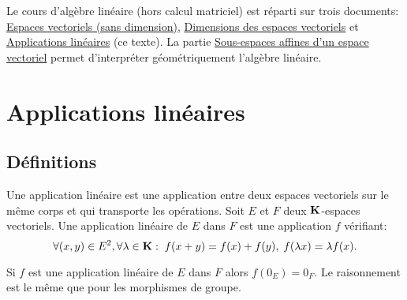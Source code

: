 

Le cours d'algèbre linéaire (hors calcul matriciel) est réparti sur trois documents:  \href{\baseurl C2076.pdf}{Espaces vectoriels (sans dimension)},  \href{\baseurl C2112.pdf}{Dimensions des espaces vectoriels} et \href{\baseurl C9587.pdf}{Applications linéaires}  (ce texte).
La partie \href{\baseurl C9895.pdf}{Sous-espaces affines d'un espace vectoriel} permet d'interpréter géométriquement l'algèbre linéaire.

\section{Applications linéaires}
\subsection{Définitions}
\begin{defi}
Une application linéaire est une application entre deux espaces vectoriels sur le même corps et qui transporte les opérations.\newline
Soit $E$ et $F$ deux $\mathbf{K}$-espaces vectoriels. Une application linéaire de $E$ dans $F$ est une application $f$ vérifiant:
\begin{displaymath}
\forall(x,y)\in E^2, \forall \lambda \in \mathbf{K}:\;f(x+y) = f(x)+f(y),\; f(\lambda x) = \lambda f(x).
\end{displaymath}
\end{defi}
   
\begin{rem}
  Si $f$ est une application linéaire de $E$ dans $F$ alors $f(0_E) = 0_F$. Le raisonnement est le même que pour les morphismes de groupe.
\end{rem}

